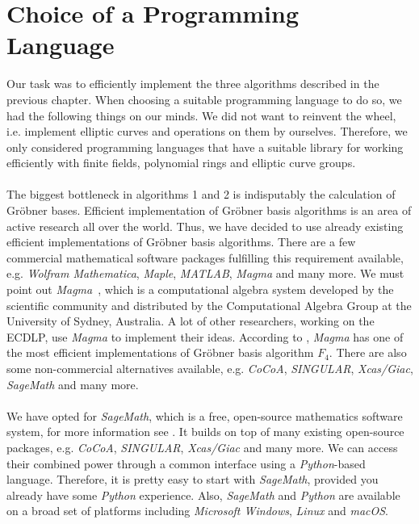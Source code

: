 \documentclass[thesis=M,english]{FITthesis}[2012/10/20]
\theoremstyle{remark}
\theoremstyle{definition}
\begin{document}
\section{Choice of a Programming Language}
Our task was to efficiently implement the three algorithms described in the previous chapter. When choosing a suitable programming language to do so, we had the following things on our minds. We did not want to reinvent the wheel, i.e. implement elliptic curves and operations on them by ourselves. Therefore, we only considered programming languages that have a suitable library for working efficiently with finite fields, polynomial rings and elliptic curve groups. \\
\\ 
\noindent The biggest bottleneck in algorithms 1 and 2 is indisputably the calculation of Gröbner bases. Efficient implementation of Gröbner basis algorithms is an area of active research all over the world. Thus, we have decided to use already existing efficient implementations of Gröbner basis algorithms. There are a few commercial mathematical software packages fulfilling this requirement available, e.g. \textit{Wolfram Mathematica}, \textit{Maple}, \textit{MATLAB}, \textit{Magma} and many more. We must point out \textit{Magma}~\cite{magma}, which is a computational algebra system developed by the scientific community and distributed by the Computational Algebra Group at the University of Sydney, Australia. A lot of other researchers, working on the ECDLP, use \textit{Magma} to implement their ideas. According to \cite{gbComp}, \textit{Magma} has one of the most efficient implementations of Gröbner basis algorithm $F_4$. There are also some non-commercial alternatives available, e.g. \textit{CoCoA}, \textit{SINGULAR}, \textit{Xcas/Giac}, \textit{SageMath} and many more. \\ \\
\noindent We have opted for \textit{SageMath}, which is a free, open-source mathematics software system, for more information see \cite{sage}. It builds on top of many existing open-source packages, e.g. \textit{CoCoA}, \textit{SINGULAR}, \textit{Xcas/Giac} and many more. We can access their combined power through a common interface using a \textit{Python}-based language. Therefore, it is pretty easy to start with \textit{SageMath}, provided you already have some \textit{Python} experience. Also, \textit{SageMath} and \textit{Python} are available on a broad set of platforms including \textit{Microsoft Windows}, \textit{Linux} and \textit{macOS}. 
\end{document}

